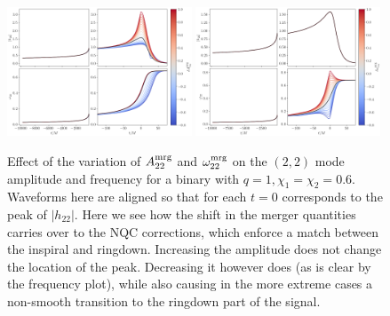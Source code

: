 \documentclass[prd,amssymb,amsmath,amsfonts,nofootinbib,reprint,showpacs,longbibliography]{revtex4-1}
\newcommand{\amrg}[1]{{A_{#1}^{\rm mrg}}}
\newcommand{\omgmrg}[1]{{\omega_{#1}^{\rm mrg}}}
\begin{document}
\begin{figure}
    \includegraphics[width=0.49\textwidth]{figs/delta_A22_mrg_-0.8_1.0.png}
    \includegraphics[width=0.49\textwidth]{figs/delta_Omg22_mrg_-0.8_1.0.png}
    \caption{\label{fig:mrgdev}
    Effect of the variation of $\amrg{22}$ and $\omgmrg{22}$ on the $(2,2)$ mode amplitude and frequency
    for a binary with $q = 1, \chi_1 = \chi_2 = 0.6$. Waveforms here are aligned so that for each
    $t = 0$ corresponds to the peak of $|h_{22}|$. Here we see how the shift in the merger quantities carries
    over to the NQC corrections, which enforce a match between the inspiral and ringdown. Increasing the amplitude
    does not change the location of the peak. Decreasing it however does (as is clear by the frequency plot),
    while also causing in the more extreme cases a non-smooth transition to the ringdown part of the signal.}
\end{figure}
\end{document}
